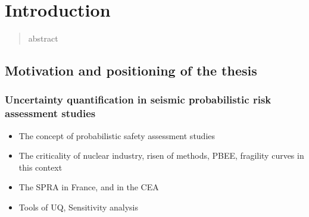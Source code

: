 

\newlength{\questlenght}
\newlength{\textminusquest}
\setlength{\textminusquest}{\textwidth}
\addtolength{\textminusquest}{-\questlenght}
\newcommand{\ques}[2]{%
\noindent\textbf{Question #1}\ \ 
\begin{minipage}[t]{\textminusquest}
    #2
\end{minipage}    
}


\chapter{Introduction}


\begin{abstract}
abstract
\end{abstract}

\minitoc


\section{Motivation and positioning of the thesis}

\subsection{Uncertainty quantification in seismic probabilistic risk assessment studies}





\begin{itemize}
    \item The concept of probabilistic safety assessment studies
    \item The criticality of nuclear industry, risen of methods, PBEE, fragility curves in this context
    \item The SPRA in France, and in the CEA %
    \item Tools of UQ, Sensitivity analysis
\end{itemize}


